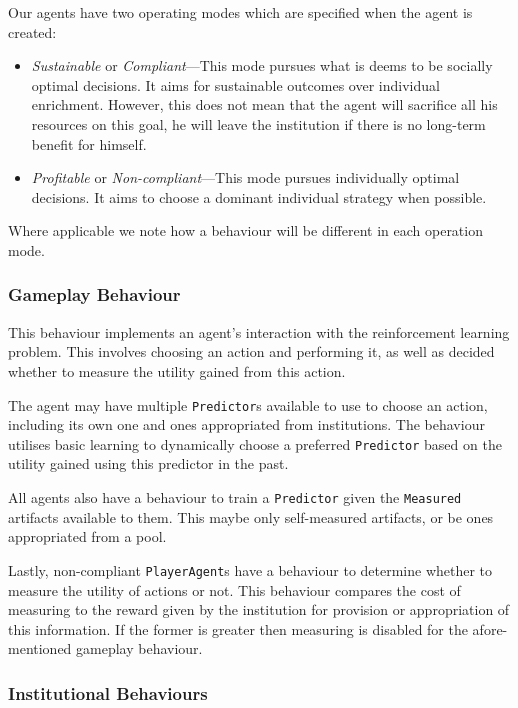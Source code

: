 Our agents have two operating modes which are specified when the agent is created:

\begin{itemize}
\item \emph{Sustainable} or \emph{Compliant}---This mode pursues what is deems to be socially optimal decisions. It aims for sustainable outcomes over individual enrichment. However, this does not mean that the agent will sacrifice all his resources on this goal, he will leave the institution if there is no long-term benefit for himself.
\item \emph{Profitable} or \emph{Non-compliant}---This mode pursues individually optimal decisions. It aims to choose a dominant individual strategy when possible.
\end{itemize}

Where applicable we note how a behaviour will be different in each operation mode.

\subsubsection*{Gameplay Behaviour}

This behaviour implements an agent's interaction with the reinforcement
learning problem. This involves choosing an action and performing it, as well
as decided whether to measure the utility gained from this action.

The agent may have multiple \texttt{Predictor}s available to use to choose an
action, including its own one and ones appropriated from institutions. The
behaviour utilises basic learning to dynamically choose a preferred
\texttt{Predictor} based on the utility gained using this predictor in the
past.

All agents also have a behaviour to train a \texttt{Predictor} given the
\texttt{Measured} artifacts available to them. This maybe only self-measured
artifacts, or be ones appropriated from a pool.

Lastly, non-compliant \texttt{PlayerAgent}s have a behaviour to determine
whether to measure the utility of actions or not. This behaviour compares the
cost of measuring to the reward given by the institution for provision or
appropriation of this information. If the former is greater then measuring is
disabled for the afore-mentioned gameplay behaviour.

\subsubsection*{Institutional Behaviours}

